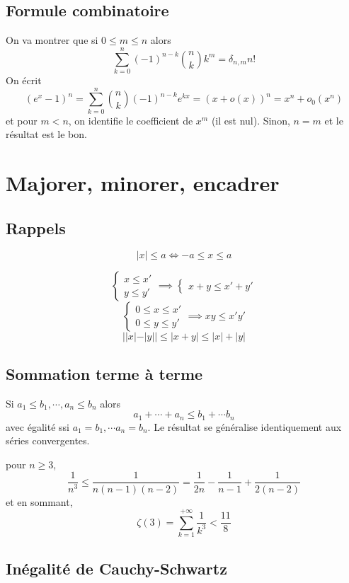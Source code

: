 \subsection{Formule combinatoire}

On va montrer que si $0\leq m\leq n$ alors \[
    \sum_{k=0}^n(-1)^{n-k}\binom nkk^m=\delta_{n,m}n!
\]
On écrit \[
    (e^x-1)^n=\sum_{k=0}^n\binom nk (-1)^{n-k}e^{kx}=(x+o(x))^n=x^n+o_0(x^n)
\]
et pour $m<n$, on identifie le coefficient de $x^m$ (il est nul). Sinon, $n=m$ et le résultat est le bon.

\section{Majorer, minorer, encadrer}

\subsection{Rappels}

\[
    |x|\leq a\iff -a\leq x\leq a
\]

\[
    \begin{cases}
        x\leq x'\\ y\leq y'
    \end{cases}
    \implies \begin{cases}
        x+y\leq x'+y'
    \end{cases}
\]
\[
    \begin{cases}
        0\leq x\leq x'\\ 0\leq y\leq y'
    \end{cases}
    \implies xy\leq x'y'
\]
\[
    ||x|-|y||\leq |x+y|\leq |x|+|y|
\]

\subsection{Sommation terme à terme}

Si $a_1\leq b_1, \cdots, a_n\leq b_n$ alors \[
    a_1+\cdots +a_n\leq b_1+\cdots b_n
\]
avec égalité ssi $a_1=b_1,\cdots a_n=b_n$. Le résultat se généralise identiquement aux séries convergentes.

\begin{ex}
    pour $n\geq 3$, \[
        \frac1{n^3}\leq \frac1{n(n-1)(n-2)}=\frac1{2n}-\frac1{n-1}+\frac1{2(n-2)}
    \]
    et en sommant, \[
        \zeta(3)=\sum_{k=1}^{+\infty}\frac1{k^3}< \frac{11}8
    \]
\end{ex}

\subsection{Inégalité de Cauchy-Schwartz}

